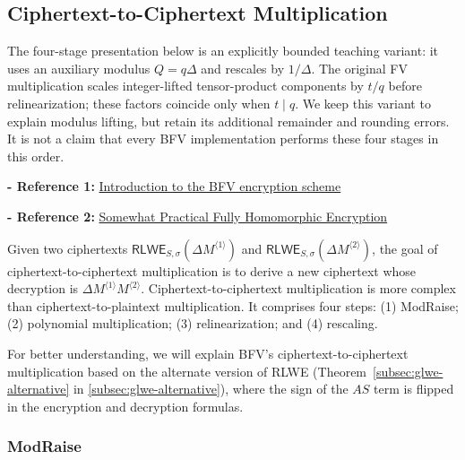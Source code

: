 \subsection{Ciphertext-to-Ciphertext Multiplication}
\label{subsec:bfv-mult-cipher}

The four-stage presentation below is an explicitly bounded teaching variant: it uses an auxiliary modulus $Q=q\Delta$ and rescales by $1/\Delta$. The original FV multiplication scales integer-lifted tensor-product components by $t/q$ before relinearization; these factors coincide only when $t\mid q$. We keep this variant to explain modulus lifting, but retain its additional remainder and rounding errors. It is not a claim that every BFV implementation performs these four stages in this order.

\noindent \textbf{- Reference 1:} 
\href{https://www.inferati.com/blog/fhe-schemes-bfv}{Introduction to the BFV encryption scheme}~\cite{inferati-bfv}

\noindent \textbf{- Reference 2:} 
\href{https://eprint.iacr.org/2012/144.pdf}{Somewhat Practical Fully Homomorphic Encryption}~\cite{cryptoeprint:2012/144}



Given two ciphertexts $\textsf{RLWE}_{S, \sigma}(\Delta M^{\langle 1\rangle })$ and $\textsf{RLWE}_{S, \sigma}(\Delta M^{\langle 2\rangle})$, the goal of ciphertext-to-ciphertext multiplication is to derive a new ciphertext whose decryption is $\Delta M^{\langle 1 \rangle} M^{\langle 2 \rangle}$. Ciphertext-to-ciphertext multiplication is more complex than ciphertext-to-plaintext multiplication. It comprises four steps: (1) \textsf{ModRaise}; (2) polynomial multiplication; (3) relinearization; and (4) rescaling. 

For better understanding, we will explain BFV's ciphertext-to-ciphertext multiplication based on the alternate version of RLWE (Theorem~\ref*{subsec:glwe-alternative} in \autoref{subsec:glwe-alternative}), where the sign of the $AS$ term is flipped in the encryption and decryption formulas.

\subsubsection{\textsf{ModRaise}}
\label{subsubsec:bfv-mult-cipher-modraise}

